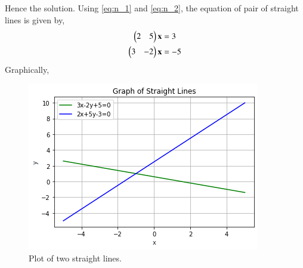 \documentclass[journal,12pt,twocolumn]{IEEEtran}
\begin{document}
Hence the solution. Using \eqref{eq:n_1} and \eqref{eq:n_2}, the equation of pair of straight lines is given by,
\begin{align}
\begin{pmatrix}2 & 5\end{pmatrix}\mathbf{x} &= 3\\
\begin{pmatrix}3 & -2\end{pmatrix}\mathbf{x} &= -5
\end{align}
Graphically,
\renewcommand{\thefigure}{\arabic{figure}}
\begin{figure}[!ht] \label{fig:straight_lines}
	\centering
	\includegraphics[width=\columnwidth]{a6_graph.png}
	\caption{Plot of two straight lines.}
\end{figure}
\end{document}
